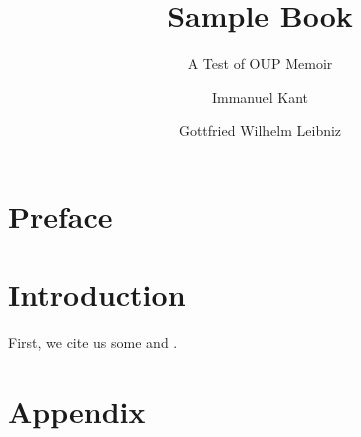 \documentclass[ebook]{oupmemoir}
\title{Sample Book}
\subtitle{A Test of OUP Memoir}
\author{Immanuel Kant\and Gottfried Wilhelm Leibniz}
\begin{document}
\maketitle

\tableofcontents*

\indexoff %

\chapter{Preface}

\kant[1-5] %

\indexon

\mainmatter

\chapter{Introduction}

First, we cite us some \textcite{Kant1746} and \textcite{Leibniz1890}.

\kant[6-20]

\appendix

\chapter{Appendix}

\kant[11-13]

\backmatter


\indexoff 

\printbibliography

\indexon

\printindex
\end{document}
